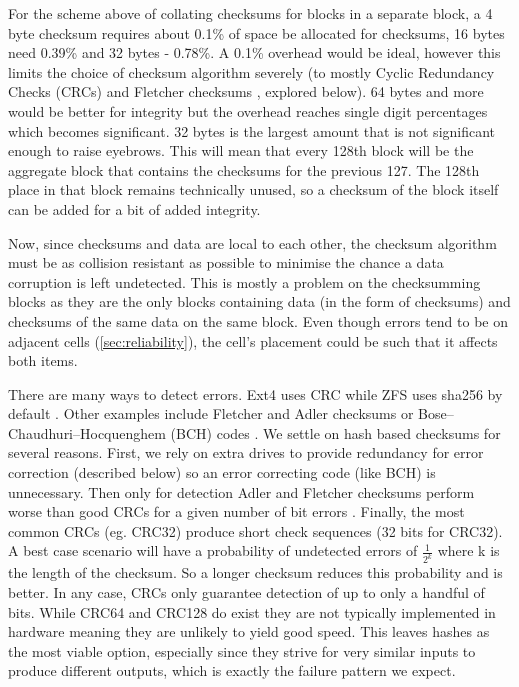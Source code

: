         For the scheme above of collating checksums for blocks in a separate
        block, a 4 byte checksum requires about 0.1\% of space be allocated for
        checksums, 16 bytes need 0.39\% and 32 bytes - 0.78\%. A 0.1\%
        overhead would be ideal, however this limits the choice of checksum
        algorithm severely (to mostly Cyclic Redundancy Checks (CRCs) and
        Fletcher checksums \cite{embedded_checksums}, explored below). 64 bytes and more would
        be better for integrity but the overhead reaches single digit
        percentages which becomes significant. 32 bytes is the largest amount
        that is not significant enough to raise eyebrows. This will mean that
        every 128th block will be the aggregate block that contains the checksums
        for the previous 127. The 128th place in that block remains technically
        unused, so a checksum of the block itself can be added for a bit of
        added integrity.

        Now, since checksums and data are local to each other, the checksum
        algorithm must be as collision resistant as possible to minimise the
        chance a data corruption is left undetected. This is mostly a problem
        on the checksumming blocks as they are the only blocks containing data
        (in the form of checksums) and checksums of the same data on the same
        block. Even though errors tend to be on adjacent cells
        (\autoref{sec:reliability}), the cell's placement could be such that it
        affects both items.

        There are many ways to detect errors. Ext4 uses CRC \cite{ext4_docs}
        while ZFS uses sha256 by default \cite{ZFS_docs}. Other examples
        include Fletcher and Adler checksums \cite{embedded_checksums} or
        Bose–Chaudhuri–Hocquenghem (BCH)
        codes \cite{flash_error_manual}. We settle on hash based checksums for
        several reasons. First, we rely on extra drives to provide redundancy
        for error correction (described below) so an error correcting code
        (like BCH) is unnecessary. Then only for detection Adler and Fletcher
        checksums perform worse than good CRCs for a given number of bit errors
        \cite{embedded_checksums}. Finally, the most common CRCs (eg.
        CRC32) produce short check sequences (32 bits for CRC32). A best case
        scenario will have a probability of undetected errors of
        $\frac{1}{2^k}$ where k is the length of the checksum. So a longer checksum reduces this
        probability and is better. In any case, CRCs only guarantee detection
        of up to only a handful of bits. While CRC64
        and CRC128 do exist they are not typically implemented in hardware
        meaning they are unlikely to yield good speed. This leaves hashes as
        the most viable option, especially since they strive for very similar inputs
        to produce different outputs, which is exactly the failure pattern we expect.

